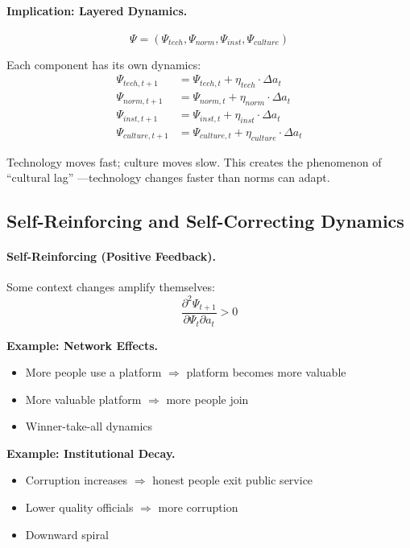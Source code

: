 \documentclass[12pt,a4paper]{article}
\begin{document}
\paragraph{Implication: Layered Dynamics.}
\begin{equation}
  \Psi = (\Psi_{tech}, \Psi_{norm}, \Psi_{inst}, \Psi_{culture})
\end{equation}

Each component has its own dynamics:
\begin{align}
  \Psi_{tech, t+1} &= \Psi_{tech, t} + \eta_{tech} \cdot \Delta a_t \\
  \Psi_{norm, t+1} &= \Psi_{norm, t} + \eta_{norm} \cdot \Delta a_t \\
  \Psi_{inst, t+1} &= \Psi_{inst, t} + \eta_{inst} \cdot \Delta a_t \\
  \Psi_{culture, t+1} &= \Psi_{culture, t} + \eta_{culture} \cdot \Delta a_t
\end{align}

Technology moves fast; culture moves slow.
This creates the phenomenon of ``cultural lag'' \citep{ogburn1922}---technology changes
faster than norms can adapt.

\subsection{Self-Reinforcing and Self-Correcting Dynamics}

\paragraph{Self-Reinforcing (Positive Feedback).}
Some context changes amplify themselves:
\begin{equation}
  \frac{\partial^2 \Psi_{t+1}}{\partial \Psi_t \partial a_t} > 0
\end{equation}

\textbf{Example: Network Effects.}
\begin{itemize}
  \item More people use a platform $\Rightarrow$ platform becomes more valuable
  \item More valuable platform $\Rightarrow$ more people join
  \item Winner-take-all dynamics
\end{itemize}

\textbf{Example: Institutional Decay.}
\begin{itemize}
  \item Corruption increases $\Rightarrow$ honest people exit public service
  \item Lower quality officials $\Rightarrow$ more corruption
  \item Downward spiral
\end{itemize}
\end{document}
